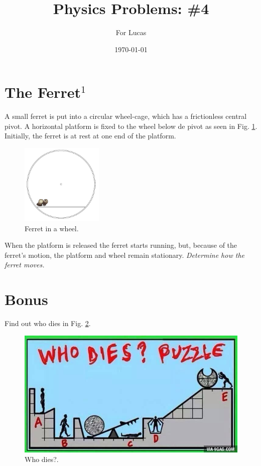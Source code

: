 \documentclass{article}
\begin{document}
\title{Physics Problems: \#4}

\author{For Lucas}

\date{\today}
\maketitle


\section*{The Ferret$^1$}

A small ferret is put into a circular wheel-cage, which has a frictionless central pivot. A horizontal platform is fixed to the wheel below de pivot as seen in Fig. \ref{fig:ferret}. Initially, the ferret is at rest at one end of the platform. \\

\begin{figure}[h!]
\begin{center}
\includegraphics[width=0.35\textwidth]{ferret}
\end{center}
\caption{Ferret in a wheel.}
\label{fig:ferret}
\end{figure}

When the platform is released the ferret starts running, but, because of the ferret's motion, the platform and wheel remain stationary. \textit{Determine how the ferret moves.}

\section*{Bonus}

Find out who dies in Fig. \ref{fig:whodies}.\\

\begin{figure}[h!]
\begin{center}
\includegraphics[width=1\textwidth]{whodies}
\end{center}
\caption{Who dies?.}
\label{fig:whodies}
\end{figure}
\end{document}

